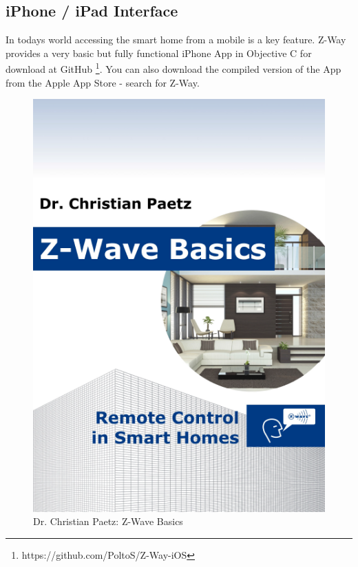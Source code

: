\subsection{iPhone / iPad Interface}

In todays world accessing the smart home from a mobile is a key feature. Z-Way provides a very basic but 
fully functional iPhone App in Objective C for download at GitHub \footnote{https://github.com/PoltoS/Z-Way-iOS}. 
You can also download the compiled version of the App from the Apple App Store - search for Z-Way.

\begin{figure} 
\begin{center}
\includegraphics[scale=0.3]{pics/book.png}
\caption{Dr. Christian Paetz: Z-Wave Basics}
\label{c2:demorouting} 
\end{center} 
\end{figure}

